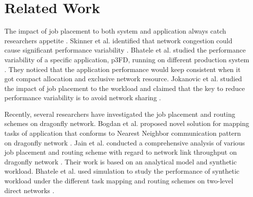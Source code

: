 \documentclass[conference,compsoc]{IEEEtran}
\begin{document}

 


\section{Related Work}
\label{sec:related work}

The impact of job placement to both system and application always catch researchers appetite \cite{dskinner} \cite{abhinav-sc13} \cite{jose-ipdps15}. Skinner et al. identified that network congestion could cause significant performance variability \cite{dskinner}. Bhatele et al. studied the performance variability of a specific application, p3FD, running on different production system \cite{abhinav-sc13}. They noticed that the application performance would keep consistent when it got compact allocation and exclusive network resource. Jokanovic et al. studied the impact of job placement to the workload and claimed that the key to reduce performance variability is to avoid network sharing \cite{jose-ipdps15}. 

Recently, several researchers have investigated the job placement and routing schemes on dragonfly network. Bogdan et al. proposed novel solution for mapping tasks of application that conforms to Nearest Neighbor communication pattern on dragonfly network \cite{hoefler-hpdc14}. Jain et al. conducted a comprehensive analysis of various job placement and routing scheme with regard to network link throughput on dragonfly network \cite{jain-sc14}. Their work is based on an analytical model and synthetic workload. Bhatele et al. used simulation to study the performance of synthetic workload under the different task mapping and routing schemes on two-level direct networks \cite{bhatele-sc11}.
\end{document}
